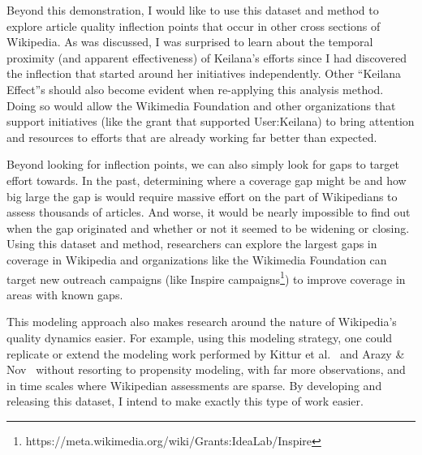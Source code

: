 Beyond this demonstration, I would like to use this dataset and method to explore article quality inflection points that occur in other cross sections of Wikipedia.  As was discussed, I was surprised to learn about the temporal proximity (and apparent effectiveness) of Keilana's efforts since I had discovered the inflection that started around her initiatives independently.  Other ``Keilana Effect''s should also become evident when re-applying this analysis method.  Doing so would allow the Wikimedia Foundation and other organizations that support initiatives (like the grant that supported User:Keilana) to bring attention and resources to efforts that are already working far better than expected.

Beyond looking for inflection points, we can also simply look for gaps to target effort towards.  In the past, determining where a coverage gap might be and how big large the gap is would require massive effort on the part of Wikipedians to assess thousands of articles.  And worse, it would be nearly impossible to find out when the gap originated and whether or not it seemed to be widening or closing.  Using this dataset and method, researchers can explore the largest gaps in coverage in Wikipedia and organizations like the Wikimedia Foundation can target new outreach campaigns (like Inspire campaigns\footnote{https://meta.wikimedia.org/wiki/Grants:IdeaLab/Inspire}) to improve coverage in areas with known gaps.

This modeling approach also makes research around the nature of Wikipedia's quality dynamics easier.  For example, using this modeling strategy, one could replicate or extend the modeling work performed by Kittur et al.~\cite{kittur08harnessing} and Arazy \& Nov~\cite{arazy10determinants} without resorting to propensity modeling, with far more observations, and in time scales where Wikipedian assessments are sparse.  By developing and releasing this dataset, I intend to make exactly this type of work easier.
